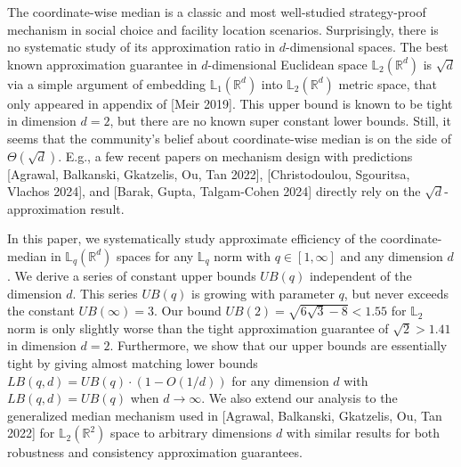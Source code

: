 The coordinate-wise median is a classic and most well-studied strategy-proof mechanism in social choice and facility location scenarios. Surprisingly, there is no systematic study of its approximation ratio in $d$-dimensional spaces. The best known approximation guarantee in $d$-dimensional Euclidean space $\mathbb{L}_2(\mathbb{R}^d)$ is $\sqrt{d}$ via a simple argument of  embedding $\mathbb{L}_1(\mathbb{R}^d)$ into $\mathbb{L}_2(\mathbb{R}^d)$ metric space, that only appeared in appendix of [Meir 2019].
This upper bound is known to be tight in dimension $d=2$, but there are no known super constant lower bounds. Still, it seems that the community's belief about coordinate-wise median is on the side of $\Theta(\sqrt{d})$. E.g., a few recent papers on mechanism design with predictions [Agrawal, Balkanski, Gkatzelis, Ou, Tan 2022], [Christodoulou, Sgouritsa, Vlachos 2024], and [Barak, Gupta, Talgam-Cohen 2024] directly rely on the $\sqrt{d}$-approximation result.

In this paper, we systematically study approximate efficiency of the coordinate-median in $\mathbb{L}_{q}(\mathbb{R}^d)$ spaces for any $\mathbb{L}_q$ norm with $q\in[1,\infty]$ and any dimension $d$. We derive a series of constant upper bounds $UB(q)$ independent of the dimension $d$. This series $UB(q)$ is growing with parameter $q$, but never exceeds the constant $UB(\infty)= 3$. Our bound $UB(2)=\sqrt{6\sqrt{3}-8}<1.55$ for $\mathbb{L}_2$ norm is only slightly worse than the tight approximation guarantee of $\sqrt{2}>1.41$ in dimension $d=2$. Furthermore, we show that our upper bounds are essentially tight
by giving almost matching lower bounds $LB(q,d)=UB(q)\cdot(1-O(1/d))$ for any dimension $d$ with $LB(q,d)=UB(q)$ when $d\to\infty$. We also extend our analysis to the generalized median mechanism used in [Agrawal, Balkanski, Gkatzelis, Ou, Tan 2022] for $\mathbb{L}_2(\mathbb{R}^2)$ space to arbitrary dimensions $d$ with similar results for both robustness and consistency approximation guarantees.



